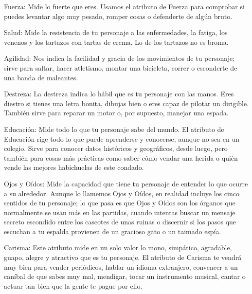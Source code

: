 \begin{description}
\item{Fuerza:}
Mide lo fuerte que eres. Usamos el atributo de Fuerza para comprobar si puedes levantar algo muy pesado, romper cosas o defenderte de algún bruto.

\item{Salud:}
Mide la resistencia de tu personaje a las enfermedades, la fatiga, los venenos y los tartazos con tartas de crema. Lo de los tartazos no es broma.

\item{Agilidad:}
Nos indica la facilidad y gracia de los movimientos de tu personaje; sirve para saltar, hacer atletismo, montar una bicicleta, correr o esconderte de una banda de maleantes.

\item{Destreza:}
La destreza indica lo hábil que es tu personaje con las manos. Eres diestro si tienes una letra bonita, dibujas bien o eres capaz de pilotar un dirigible. También sirve para reparar un motor o, por supuesto, manejar una espada.

\item{Educación:}
Mide todo lo que tu personaje sabe del mundo. El atributo de Educación rige todo lo que puede aprenderse y conocerse; aunque no sea en un colegio. Sirve para conocer datos históricos y geográficos, desde luego, pero también para cosas más prácticas como saber cómo vendar una herida o quién vende las mejores habichuelas de este condado.

\item{Ojos y Oídos:}
Mide la capacidad que tiene tu personaje de entender lo que ocurre a su alrededor. Aunque lo llamemos Ojos y Oídos, en realidad incluye los cinco sentidos de tu personaje; lo que pasa es que Ojos y Oídos son los órganos que normalmente se usan más en las partidas, cuando intentas buscar un mensaje secreto escondido entre los cascotes de unas ruinas o discernir si los pasos que escuchan a tu espalda provienen de un gracioso gato o un taimado espía.

\item{Carisma:}
Este atributo mide en un solo valor lo mono, simpático, agradable, guapo, alegre y atractivo que es tu personaje. El atributo de Carisma te vendrá muy bien para vender periódicos, hablar un idioma extranjero, convencer a un caníbal de que sabes muy mal, mendigar, tocar un instrumento musical, cantar o actuar tan bien que la gente te pague por ello.

\end{description}


